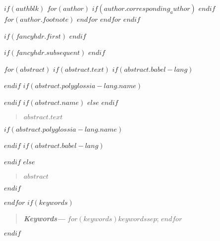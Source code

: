 $if(authblk)$
$for(author)$
$if(author.corresponding_author)$
\makeatletter{}\makeatother
$endif$
$for(author.footnote)$
$endfor$
$endfor$
$endif$

$if(fancyhdr.first)$
\thispagestyle{myfirst}
$endif$

$if(fancyhdr.subsequent)$
\pagestyle{mysubsequent}
$endif$

\let\oldabstractname\abstractname

$for(abstract)$
$if(abstract.text)$
$if(abstract.babel-lang)$
\begin{otherlanguage}{$abstract.babel-lang$}
$endif$
$if(abstract.polyglossia-lang.name)$
\begin{otherlanguage}{$abstract.polyglossia-lang.name$}
$endif$
$if(abstract.name)$
\renewcommand{\abstractname}{$abstract.name$}
$else$
\renewcommand{\abstractname}{\oldabstractname}
$endif$
\begin{abstract}
$abstract.text$
\end{abstract}
$if(abstract.polyglossia-lang.name)$
\end{otherlanguage}
$endif$
$if(abstract.babel-lang)$
\end{otherlanguage}
$endif$
$else$
\begin{abstract}
$abstract$
\end{abstract}
$endif$

$endfor$
$if(keywords)$
\providecommand{\keywords}[1]
{
  \small\textbf{\textit{Keywords---}} #1
}

\renewcommand{\abstractname}{}
\begin{abstract}
\keywords{$for(keywords)$$keywords$$sep$; $endfor$}
\end{abstract}
\renewcommand{\abstractname}{\oldabstractname}
$endif$
